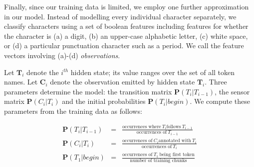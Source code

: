 Finally, since our training data is limited, we employ one further
approximation in our model. Instead of modelling every individual
character separately, we classify characters using a set of boolean features
including features for whether the character is (a) a digit, (b) an
upper-case alphabetic letter, (c) white space, or (d) a particular
punctuation character such as a period.  We call the feature vectors
involving (a)-(d) {\em observations}.

%

Let $\mathbf{T}_i$ denote the $i^{th}$ hidden state; its value ranges over
the set of all token names.
Let $\mathbf{C}_i$ denote the observation emitted by hidden state $\mathbf{T}_i$.
Three parameters determine the model:
the transition matrix $\mathbf{P}(T_i|T_{i-1})$,
the sensor matrix $\mathbf{P}(C_i|T_i)$ and the initial
probabilities $\mathbf{P}(T_i|begin)$. 
We compute these parameters from the training data as follows:

\begin{eqnarray}
\mathbf{P}(T_i|T_{i-1}) & = & \frac{\textrm{occurrences where}~ T_i\textrm{
follows}~ T_{i-1}}{\textrm{occurrences of}~ T_{i-1}} \label{eqn:1}\\
\mathbf{P}(C_i|T_i) & = & \frac{\textrm{occurrences of}~ C_i \textrm{
annotated with}~ T_i}{\textrm{occurrences of}~ T_i} \\
\mathbf{P}(T_1|begin) & = & \frac{\textrm{occurrences of}~ T_1~ \textrm{being first token}}
{\textrm{number of training chunks}} \label{eqn:2}
\end{eqnarray}

